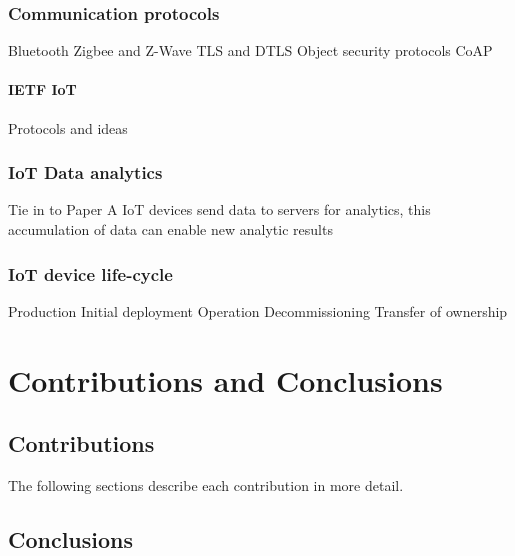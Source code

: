 \subsection{Communication protocols}
Bluetooth
Zigbee and Z-Wave
TLS and DTLS
Object security protocols
CoAP

\subsubsection{IETF IoT}
Protocols and ideas

\subsection{IoT Data analytics}
Tie in to Paper A
IoT devices send data to servers for analytics, this accumulation of data can enable new analytic results 

\subsection{IoT device life-cycle}
Production
Initial deployment
Operation
Decommissioning
Transfer of ownership

\chapter{Contributions and Conclusions}
\section{Contributions}
The following sections describe each contribution in more detail.

\subsection{\paperItitle}

\section{Conclusions}
\label{sec:kappa-conclusions}
{ \raggedright
\printbibliography[segment=\therefsegment,heading=bibintoc]
}
